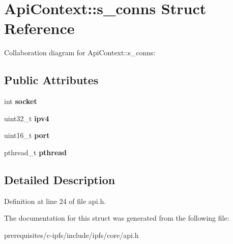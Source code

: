 \hypertarget{struct_api_context_1_1s__conns}{}\section{Api\+Context\+:\+:s\+\_\+conns Struct Reference}
\label{struct_api_context_1_1s__conns}


Collaboration diagram for Api\+Context\+:\+:s\+\_\+conns\+:
\subsection*{Public Attributes}
\begin{DoxyCompactItemize}
\item 
\mbox{\label{struct_api_context_1_1s__conns_a78239d4475594420883a7a91ddaca6ce}} 
int {\bfseries socket}
\item 
\mbox{\label{struct_api_context_1_1s__conns_a8fda1a80d94c574abf3ec78d599b17b9}} 
uint32\+\_\+t {\bfseries ipv4}
\item 
\mbox{\label{struct_api_context_1_1s__conns_ac4aed5d61e73192e52fb7f710e7c6cef}} 
uint16\+\_\+t {\bfseries port}
\item 
\mbox{\label{struct_api_context_1_1s__conns_ace8ee5806e1cde9c5a83bcf5f4cb1a3f}} 
pthread\+\_\+t {\bfseries pthread}
\end{DoxyCompactItemize}


\subsection{Detailed Description}


Definition at line 24 of file api.\+h.



The documentation for this struct was generated from the following file\+:\begin{DoxyCompactItemize}
\item 
prerequisites/c-\/ipfs/include/ipfs/core/api.\+h\end{DoxyCompactItemize}
